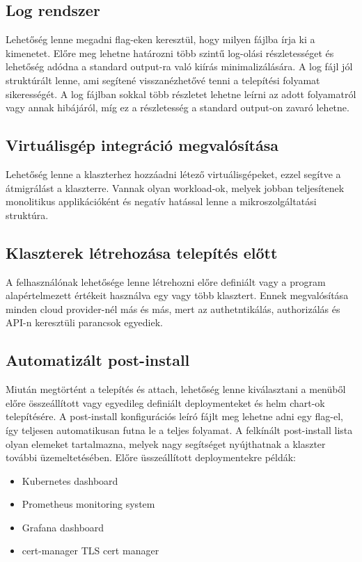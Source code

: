 \subsection{Log rendszer}
Lehetőség lenne megadni flag-eken keresztül, hogy milyen fájlba írja ki a kimenetet. Előre meg lehetne határozni több szintű log-olási részletességet és lehetőség adódna a standard output-ra való kiírás minimalizálására. A log fájl jól struktúrált lenne, ami segítené visszanézhetővé tenni a telepítési folyamat sikerességét. A log fájlban sokkal több részletet lehetne leírni az adott folyamatról vagy annak hibájáról, míg ez a részletesség a standard output-on zavaró lehetne. 
\subsection{Virtuálisgép integráció megvalósítása}
Lehetőség lenne a klaszterhez hozzáadni létező virtuálisgépeket, ezzel segítve a átmigrálást a klaszterre. Vannak olyan workload-ok, melyek jobban teljesítenek monolitikus applikációként és negatív hatással lenne a mikroszolgáltatási struktúra.
\subsection{Klaszterek létrehozása telepítés előtt}
A felhasználónak lehetősége lenne létrehozni előre definiált vagy a program alapértelmezett értékeit használva egy vagy több klasztert. Ennek megvalósítása minden cloud provider-nél más és más, mert az authetntikálás, authorizálás és API-n keresztüli parancsok egyediek.
\subsection{Automatizált post-install}
Miután megtörtént a telepítés és attach, lehetőség lenne kiválasztani a menüből előre összeállított vagy egyedileg definiált deploymenteket és helm chart-ok telepítésére. A post-install konfigurációs leíró fájlt meg lehetne adni egy flag-el, így teljesen automatikusan futna le a teljes folyamat. A felkínált post-install lista olyan elemeket tartalmazna, melyek nagy segítséget nyújthatnak a klaszter további üzemeltetésében. 
Előre üsszeállított deploymentekre példák:
\begin{itemize}
    \item Kubernetes dashboard
    \item Prometheus monitoring system
    \item Grafana dashboard
    \item cert-manager TLS cert manager
\end{itemize}
